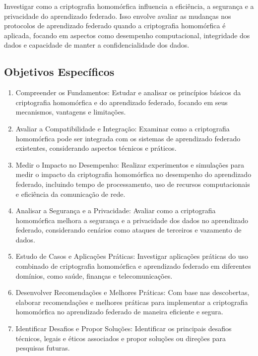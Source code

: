 \documentclass{article}
\begin{document}
Investigar como a criptografia homomórfica influencia a eficiência, a segurança e a privacidade do aprendizado federado. Isso envolve avaliar as mudanças nos protocolos de aprendizado federado quando a criptografia homomórfica é aplicada, focando em aspectos como desempenho computacional, integridade dos dados e capacidade de manter a confidencialidade dos dados.

\subsection{Objetivos Específicos}

\begin{enumerate}
    \item Compreender os Fundamentos: Estudar e analisar os princípios básicos da criptografia homomórfica e do aprendizado federado, focando em seus mecanismos, vantagens e limitações.

    \item Avaliar a Compatibilidade e Integração: Examinar como a criptografia homomórfica pode ser integrada com os sistemas de aprendizado federado existentes, considerando aspectos técnicos e práticos.

    \item Medir o Impacto no Desempenho: Realizar experimentos e simulações para medir o impacto da criptografia homomórfica no desempenho do aprendizado federado, incluindo tempo de processamento, uso de recursos computacionais e eficiência da comunicação de rede.

    \item Analisar a Segurança e a Privacidade: Avaliar como a criptografia homomórfica melhora a segurança e a privacidade dos dados no aprendizado federado, considerando cenários como ataques de terceiros e vazamento de dados.

    \item Estudo de Casos e Aplicações Práticas: Investigar aplicações práticas do uso combinado de criptografia homomórfica e aprendizado federado em diferentes domínios, como saúde, finanças e telecomunicações.

    \item Desenvolver Recomendações e Melhores Práticas: Com base nas descobertas, elaborar recomendações e melhores práticas para implementar a criptografia homomórfica no aprendizado federado de maneira eficiente e segura.

    \item Identificar Desafios e Propor Soluções: Identificar os principais desafios técnicos, legais e éticos associados e propor soluções ou direções para pesquisas futuras.

\end{enumerate}
\end{document}
